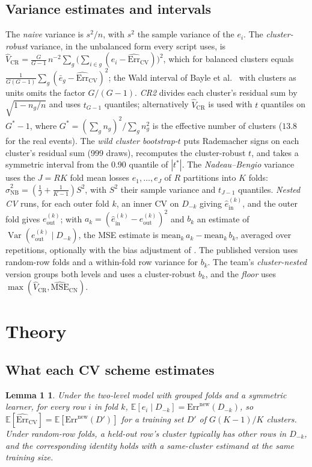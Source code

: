 \documentclass[11pt]{amsart}
\theoremstyle{plain}
\newtheorem*{lem1}{Lemma 1}
\theoremstyle{definition}
\theoremstyle{remark}
\newcommand{\Var}{\operatorname{Var}}
\newcommand{\E}{\mathbb{E}}
\newcommand{\CV}{\widehat{\mathrm{Err}}_{\mathrm{CV}}}
\newcommand{\VCR}{\hat V_{\mathrm{CR}}}
\newcommand{\VNB}{\hat\sigma^2_{\mathrm{NB}}}
\begin{document}
\subsection*{Variance estimates and intervals}
The \emph{naive} variance is $s^2/n$, with $s^2$ the sample variance of the $e_i$. The \emph{cluster-robust} variance, in the unbalanced form every script uses, is $\VCR=\frac{G}{G-1}\,n^{-2}\sum_{g}\bigl(\sum_{i\in g}(e_i-\CV)\bigr)^2$, which for balanced clusters equals $\frac{1}{G(G-1)}\sum_g(\bar e_g-\CV)^2$; the Wald interval of Bayle et al.~\cite{BBJM} with clusters as units omits the factor $G/(G-1)$. \emph{CR2} divides each cluster's residual sum by $\sqrt{1-n_g/n}$ and uses $t_{G-1}$ quantiles; alternatively $\VCR$ is used with $t$ quantiles on $G^*-1$, where $G^*=(\sum_g n_g)^2/\sum_g n_g^2$ is the effective number of clusters ($13.8$ for the real events). The \emph{wild cluster bootstrap-$t$} puts Rademacher signs on each cluster's residual sum (999 draws), recomputes the cluster-robust $t$, and takes a symmetric interval from the 0.90 quantile of $|t^*|$. The \emph{Nadeau--Bengio} variance \cite{NB,BF} uses the $J=RK$ fold mean losses $e_1,\dots,e_J$ of $R$ partitions into $K$ folds: $\VNB=(\frac1J+\frac1{K-1})S^2$, with $S^2$ their sample variance and $t_{J-1}$ quantiles. \emph{Nested CV} \cite{BHT} runs, for each outer fold $k$, an inner CV on $D_{-k}$ giving $\hat e^{(k)}_{\mathrm{in}}$, and the outer fold gives $e^{(k)}_{\mathrm{out}}$; with $a_k=(\hat e^{(k)}_{\mathrm{in}}-e^{(k)}_{\mathrm{out}})^2$ and $b_k$ an estimate of $\Var(e^{(k)}_{\mathrm{out}}\mid D_{-k})$, the MSE estimate is $\mathrm{mean}_k\,a_k-\mathrm{mean}_k\,b_k$, averaged over repetitions, optionally with the bias adjustment of \cite{BHT}. The published version uses random-row folds and a within-fold row variance for $b_k$. The team's \emph{cluster-nested} version groups both levels and uses a cluster-robust $b_k$, and the \emph{floor} uses $\max(\VCR,\widehat{\mathrm{MSE}}_{\mathrm{CN}})$.

\section{Theory}\label{sec:theory}

\subsection{What each CV scheme estimates}

\begin{lem1}
Under the two-level model with grouped folds and a symmetric learner, for every row $i$ in fold $k$,
$\E[e_i\mid D_{-k}]=\mathrm{Err}^{\mathrm{new}}(D_{-k})$, so $\E[\CV]=\E[\mathrm{Err}^{\mathrm{new}}(D')]$ for a training set $D'$ of $G(K-1)/K$ clusters. Under random-row folds, a held-out row's cluster typically has other rows in $D_{-k}$, and the corresponding identity holds with a same-cluster estimand at the same training size.
\end{lem1}
\end{document}
